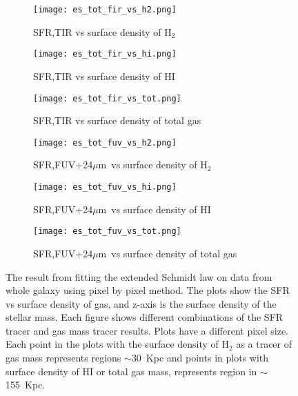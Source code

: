 \documentclass[useAMS,usenatbib]{mn2e}
\newcommand \um    {$\mu$m\ }
\begin{document}
\begin{figure*}
    \centering
    \begin{subfigure}[b]{0.3\textwidth}
        \centering
        \texttt{[image: es\_tot\_fir\_vs\_h2.png]}
        \caption{SFR,TIR vs surface density of H$_2$}
        \label{fig:es,all,fir,h2}
    \end{subfigure}
    \hfill
    \begin{subfigure}[b]{0.3\textwidth}
        \centering
        \texttt{[image: es\_tot\_fir\_vs\_hi.png]}
        \caption{SFR,TIR vs surface density of HI}
        \label{fig:es,all,fir,hi}
    \end{subfigure}
    \hfill
   \begin{subfigure}[b]{0.3\textwidth}
        \centering
        \texttt{[image: es\_tot\_fir\_vs\_tot.png]}
        \caption{SFR,TIR vs surface density of total gas}
        \label{fig:es,all,fir,tot}
    \end{subfigure}
    \hfill
     \begin{subfigure}[b]{0.3\textwidth}
        \centering
        \texttt{[image: es\_tot\_fuv\_vs\_h2.png]}
        \caption{SFR,FUV+24\um vs surface density of H$_2$}
        \label{fig:es,all,fuv,h2}
    \end{subfigure}
     \hfill
   \begin{subfigure}[b]{0.3\textwidth}
        \centering
        \texttt{[image: es\_tot\_fuv\_vs\_hi.png]}
        \caption{SFR,FUV+24\um vs surface density of HI}
        \label{fig:es,all,fuv,hi}
    \end{subfigure}
    \hfill
    \begin{subfigure}[b]{0.3\textwidth}
        \centering
        \texttt{[image: es\_tot\_fuv\_vs\_tot.png]}
        \caption{SFR,FUV+24\um vs surface density of total gas}
        \label{fig:es,all,fuv,tot}
    \end{subfigure}
    \caption{The result from fitting the extended Schmidt law on data from whole galaxy using pixel by pixel method. The plots show the SFR vs surface density of gas, and z-axis is the surface density of the stellar mass. Each figure shows different combinations of the SFR tracer and gas mass tracer results. Plots have a different pixel size. Each point in the plots with the surface density of H$_2$ as a tracer of gas mass represents regions $\sim$30~Kpc and points in plots with surface density of HI or total gas mass, represents region in $\sim$155~Kpc.}
    \label{fig:es,all}
\end{figure*}
\end{document}
